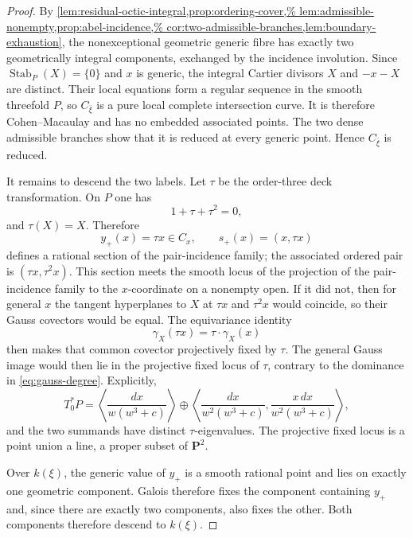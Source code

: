 \documentclass[10pt]{amsart}
\numberwithin{equation}{section}
\theoremstyle{definition}
\theoremstyle{remark}
\newcommand{\PP}{\mathbf P}
\newcommand{\Stab}{\operatorname{Stab}}
\begin{document}
\begin{proof}
By
\cref{lem:residual-octic-integral,prop:ordering-cover,%
lem:admissible-nonempty,prop:abel-incidence,%
cor:two-admissible-branches,lem:boundary-exhaustion},
the nonexceptional geometric generic fibre has exactly two geometrically
integral components, exchanged by the incidence involution.  Since
$\Stab_P(X)=\{0\}$ and $x$ is generic, the integral Cartier divisors $X$ and
$-x-X$ are distinct.  Their local equations form a regular sequence in the
smooth threefold $P$, so $C_{\bar\xi}$ is a pure local complete intersection
curve.  It is therefore Cohen--Macaulay and has no embedded associated
points.  The two dense admissible branches show that it is reduced at every
generic point.  Hence $C_{\bar\xi}$ is reduced.

It remains to descend the two labels.  Let $\tau$
be the order-three deck transformation.  On $P$ one has
\[
 1+\tau+\tau^2=0,
\]
and $\tau(X)=X$.  Therefore
\[
 y_+(x)=\tau x\in C_x,
 \qquad s_+(x)=(x,\tau x)
\]
defines a rational section of the pair-incidence family; the associated
ordered pair is $(\tau x,\tau^2x)$.  This section meets the smooth locus of the projection of the pair-incidence
family to the $x$-coordinate on a nonempty open.  If it did not, then for
general $x$ the tangent hyperplanes to $X$ at $\tau x$ and $\tau^2x$ would
coincide, so their Gauss covectors would be equal.  The equivariance identity
\[
 \gamma_X(\tau x)=\tau\cdot\gamma_X(x)
\]
then makes that common covector projectively fixed by $\tau$.  The general
Gauss image would then lie in the projective fixed locus of $\tau$, contrary
to the dominance in \eqref{eq:gauss-degree}.  Explicitly,
\[
 T_0^*P=
 \left\langle\frac{dx}{w(w^3+c)}\right\rangle
 \oplus
 \left\langle
   \frac{dx}{w^2(w^3+c)},
   \frac{x\,dx}{w^2(w^3+c)}
 \right\rangle,
\]
and the two summands have distinct $\tau$-eigenvalues.  The projective fixed
locus is a point union a line, a proper subset of $\PP^2$.

Over $k(\xi)$, the generic value of $y_+$ is a smooth rational point and
lies on exactly one geometric component.  Galois therefore fixes the
component containing $y_+$ and, since there are exactly two components,
also fixes the other.  Both components therefore descend to $k(\xi)$.
\end{proof}
\end{document}
